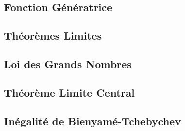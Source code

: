 \documentclass{article}
\begin{document}
\subsection{Fonction Génératrice}

\subsection{Théorèmes Limites}

\subsection{Loi des Grands Nombres}
\subsection{Théorème Limite Central}
\subsection{Inégalité de Bienyamé-Tchebychev}
\end{document}
